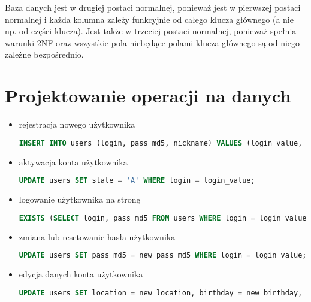 Baza danych jest w drugiej postaci normalnej, ponieważ jest w pierwszej postaci normalnej i każda kolumna zależy funkcyjnie od całego klucza głównego (a nie np. od części klucza). Jest także w trzeciej postaci normalnej, ponieważ spełnia warunki 2NF oraz wszystkie pola niebędące polami klucza głównego są od niego zależne bezpośrednio.


\clearpage
\section{Projektowanie operacji na danych}
\label{sec:operacje}

\begin{itemize}
\item rejestracja nowego użytkownika
\begin{lstlisting}[language=SQL]
INSERT INTO users (login, pass_md5, nickname) VALUES (login_value, pass_md5_value, nickname_value);
\end{lstlisting}

\item aktywacja konta użytkownika
\begin{lstlisting}[language=SQL]
UPDATE users SET state = 'A' WHERE login = login_value;
\end{lstlisting}

\item logowanie użytkownika na stronę
\begin{lstlisting}[language=SQL]
EXISTS (SELECT login, pass_md5 FROM users WHERE login = login_value AND pass_md5 = pass_md5_value);
\end{lstlisting}

\item zmiana lub resetowanie hasła użytkownika
\begin{lstlisting}[language=SQL]
UPDATE users SET pass_md5 = new_pass_md5 WHERE login = login_value;
\end{lstlisting}

\item edycja danych konta użytkownika
\begin{lstlisting}[language=SQL]
UPDATE users SET location = new_location, birthday = new_birthday, homepage = new_homapage, show_chars = tru_fal_value1, show_scenarios = tru_fal_value2, comment_notify = tru_fal_value3, session_notify = tru_fal_value4, message_notify = tru_fal_value5 WHERE login = login_value;
\end{lstlisting}


\end{itemize}
